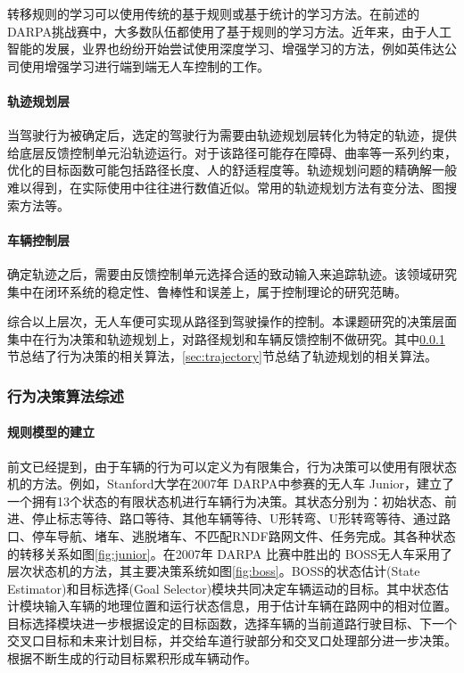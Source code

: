       转移规则的学习可以使用传统的基于规则或基于统计的学习方法。在前述的 DARPA挑战赛中，大多数队伍都使用了基于规则的学习方法\cite{Buehler2009The}。近年来，由于人工智能的发展，业界也纷纷开始尝试使用深度学习、增强学习的方法，例如英伟达公司使用增强学习进行端到端无人车控制的工作\cite{Bojarski2016End}。

      \paragraph{轨迹规划层} 当驾驶行为被确定后，选定的驾驶行为需要由轨迹规划层转化为特定的轨迹，提供给底层反馈控制单元沿轨迹运行。对于该路径可能存在障碍、曲率等一系列约束，优化的目标函数可能包括路径长度、人的舒适程度等。轨迹规划问题的精确解一般难以得到，在实际使用中往往进行数值近似。常用的轨迹规划方法有变分法、图搜索方法等。

      \paragraph{车辆控制层} 确定轨迹之后，需要由反馈控制单元选择合适的致动输入来追踪轨迹。该领域研究集中在闭环系统的稳定性、鲁棒性和误差上，属于控制理论的研究范畴。

      综合以上层次，无人车便可实现从路径到驾驶操作的控制。本课题研究的决策层面集中在行为决策和轨迹规划上，对路径规划和车辆反馈控制不做研究。其中\ref{sec:behavior}节总结了行为决策的相关算法，\ref{sec:trajectory}节总结了轨迹规划的相关算法。

    \subsubsection{行为决策算法综述}
    \label{sec:behavior}
      \paragraph{规则模型的建立}
      前文已经提到，由于车辆的行为可以定义为有限集合，行为决策可以使用有限状态机的方法。例如，Stanford大学在2007年 DARPA中参赛的无人车 Junior，建立了一个拥有13个状态的有限状态机进行车辆行为决策\cite{Montemerlo2008Junior}。其状态分别为：初始状态、前进、停止标志等待、路口等待、其他车辆等待、U形转弯、U形转弯等待、通过路口、停车导航、堵车、逃脱堵车、不匹配RNDF路网文件、任务完成。其各种状态的转移关系如图\ref{fig:junior}。在2007年 DARPA 比赛中胜出的 BOSS\cite{Baker2008Traffic}无人车采用了层次状态机的方法，其主要决策系统如图\ref{fig:boss}。BOSS的状态估计(State Estimator)和目标选择(Goal Selector)模块共同决定车辆运动的目标。其中状态估计模块输入车辆的地理位置和运行状态信息，用于估计车辆在路网中的相对位置。目标选择模块进一步根据设定的目标函数，选择车辆的当前道路行驶目标、下一个交叉口目标和未来计划目标，并交给车道行驶部分和交叉口处理部分进一步决策。根据不断生成的行动目标累积形成车辆动作。


